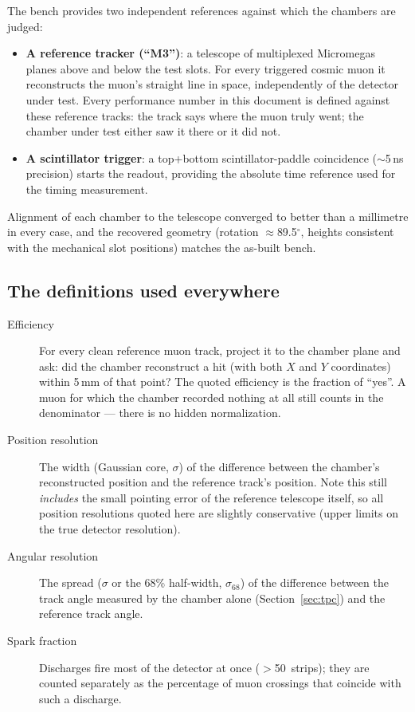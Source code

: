 \documentclass[11pt]{article}
\begin{document}
The bench provides two independent references against which the chambers are
judged:
\begin{itemize}
  \item \textbf{A reference tracker (``M3'')}: a telescope of multiplexed
        Micromegas planes above and below the test slots. For every triggered
        cosmic muon it reconstructs the muon's straight line in space,
        independently of the detector under test. Every performance number in
        this document is defined against these reference tracks: the track says
        where the muon truly went; the chamber under test either saw it there
        or it did not.
  \item \textbf{A scintillator trigger}: a top+bottom scintillator-paddle
        coincidence ($\sim$5\,ns precision) starts the readout, providing the
        absolute time reference used for the timing measurement.
\end{itemize}

Alignment of each chamber to the telescope converged to better than a
millimetre in every case, and the recovered geometry (rotation
$\approx$89.5$^\circ$, heights consistent with the mechanical slot positions)
matches the as-built bench.

\subsection{The definitions used everywhere}
\label{sec:defs}

\begin{description}
  \item[Efficiency] For every clean reference muon track, project it to the
  chamber plane and ask: did the chamber reconstruct a hit (with both $X$ and
  $Y$ coordinates) within 5\,mm of that point? The quoted efficiency is the
  fraction of ``yes''. A muon for which the chamber recorded nothing at all
  still counts in the denominator --- there is no hidden normalization.
  \item[Position resolution] The width (Gaussian core, $\sigma$) of the
  difference between the chamber's reconstructed position and the reference
  track's position. Note this still \emph{includes} the small pointing error of
  the reference telescope itself, so all position resolutions quoted here are
  slightly conservative (upper limits on the true detector resolution).
  \item[Angular resolution] The spread ($\sigma$ or the 68\% half-width,
  $\sigma_{68}$) of the difference between the track angle measured by the
  chamber alone (Section~\ref{sec:tpc}) and the reference track angle.
  \item[Spark fraction] Discharges fire most of the detector at once
  ($>$50~strips); they are counted separately as the percentage of muon
  crossings that coincide with such a discharge.
\end{description}
\end{document}
